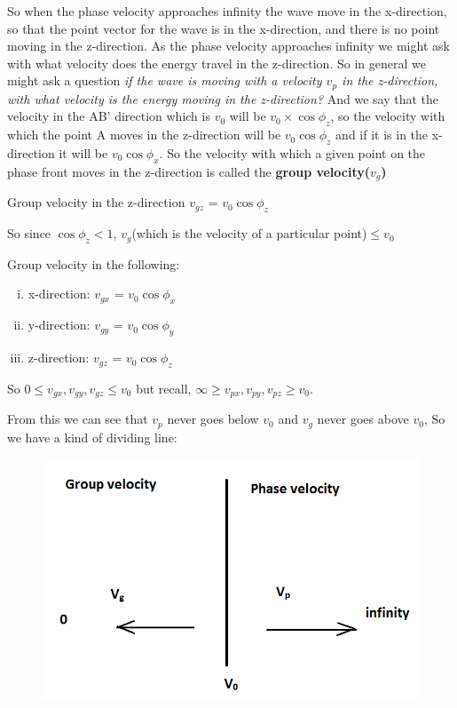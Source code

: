 So when the phase velocity approaches infinity the wave move in the x-direction, so that the point vector for the wave is in the x-direction, and there is no point moving in the z-direction.
As the phase velocity approaches infinity we might ask with what velocity does the energy travel in the z-direction.
So in general we might ask a question \emph{if the wave is moving with a velocity $v_p$ in the z-direction, with what velocity is the energy moving in the z-direction?}
And we say that the velocity in the AB' direction which is $v_0$ will be $v_0\times\cos\phi_{z}$, so the velocity with which the point A moves in the z-direction will be $v_0\cos\phi_{z}$ and if it is in the x-direction it will be $v_0\cos\phi_{x}$. So the velocity with which a given point on the phase front moves in the z-direction is called the \textbf{group velocity($v_g$)}

\begin{center}
Group velocity in the z-direction
$v_{gz}$ = $v_0\cos\phi_{z}$
\end{center}
So since $\cos\phi_{z} < 1$, $v_g$(which is the velocity of a particular point)$\leq v_0$


Group velocity in the following:
\begin{enumerate}[(i)]
\item x-direction:	$v_{gx}$ = $v_0\cos\phi_{x}$
\item y-direction: 	$v_{gy}$ = $v_0\cos\phi_{y}$
\item z-direction:	$v_{gz}$ = $v_0\cos\phi_{z}$
\end{enumerate}

So $0\leq v_{gx},v_{gy},v_{gz} \leq v_0$ but recall, $\infty\geq v_{px},v_{py},v_{pz} \geq v_0$.

From this we can see that $v_p$ never goes below $v_0$ and $v_g$ never goes above $v_0$,
So we have a kind of dividing line:
\begin{figure}[h]
\centering
\includegraphics[width=.8\linewidth]{graphics/img3}
\caption{}
\end{figure}

